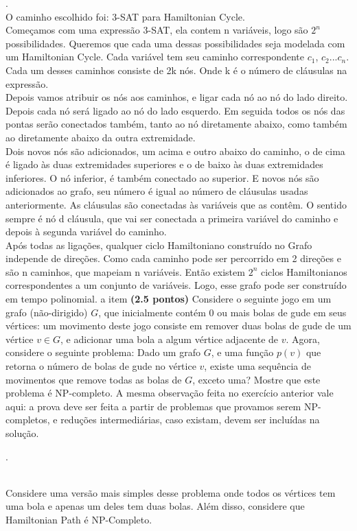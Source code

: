 \documentclass[12pt]{article}
\newcommand{\resposta}[1]{ \noindent {\bf Solução}.{\color{blue} #1}}
\begin{document}
\begin{enumerate}
\resposta{
    \\O caminho escolhido foi: 3-SAT para Hamiltonian Cycle.\\
    Começamos com uma expressão 3-SAT, ela contem n variáveis, logo são $2^n$ possibilidades. Queremos que cada uma dessas possibilidades seja modelada com um Hamiltonian Cycle. Cada variável tem seu caminho correspondente $c_1$, $c_2$...$c_n$. Cada um desses caminhos consiste de 2k nós. Onde k é o número de cláusulas na expressão.\\Depois vamos atribuir os nós aos caminhos, e ligar cada nó ao nó do lado direito. Depois cada nó será ligado ao nó do lado esquerdo. Em seguida todos os nós das pontas serão conectados também, tanto ao nó diretamente abaixo, como também ao diretamente abaixo da outra extremidade. \\
    Dois novos nós são adicionados, um acima e outro abaixo do caminho, o de cima é ligado às duas extremidades superiores e o de baixo às duas extremidades inferiores.  O nó inferior, é também conectado ao superior. E novos nós são adicionados ao grafo, seu número é igual ao número de cláusulas usadas anteriormente. As cláusulas são conectadas às variáveis que as contêm. O sentido sempre é 
  nó d} cláusula, que vai ser conectada a primeira variável do caminho e depois à segunda variável do caminho.\\
    Após todas as ligações, qualquer ciclo Hamiltoniano construído no Grafo independe de direções. Como cada caminho pode ser percorrido em 2 direções e são n caminhos, que mapeiam n variáveis. Então existem $2^n$ ciclos Hamiltonianos correspondentes a um conjunto de variáveis. 
    Logo, esse grafo pode ser construído em tempo polinomial.
  a
\newpage
\do item {\bf (2.5 pontos)} Considere o seguinte jogo em um grafo
  (não-dirigido) $G$, que inicialmente contém 0 ou mais bolas de gude
  em seus vértices: um movimento deste jogo consiste em remover duas
  bolas de gude de um vértice $v\in G$, e adicionar uma bola a algum
  vértice adjacente de $v$. Agora, considere o seguinte problema: Dado
  um grafo $G$, e uma função $p(v)$ que retorna o número de bolas de
  gude no vértice $v$, existe uma sequência de movimentos que remove
  todas as bolas de $G$, exceto uma? Mostre que este problema é
  NP-completo. A mesma observação feita no exercício anterior vale
  aqui: a prova deve ser feita a partir de problemas que provamos
  serem NP-completos, e reduções intermediárias, caso existam, devem
  ser incluídas na solução.

  \resposta{
    \\Considere uma versão mais simples desse problema onde todos os vértices tem uma bola e apenas um deles tem duas bolas. Além disso, considere que Hamiltonian Path é NP-Completo. 
    
}
\end{enumerate}
\end{document}

